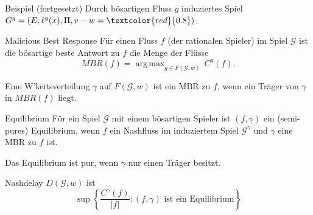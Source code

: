 \documentclass{beamer}
\DeclareMathOperator*{\argmax}{arg\,max}
\begin{document}
\begin{frame}{Beispiel (fortgesetzt)}
	Durch bösartigen Fluss $g$ induziertes Spiel $G^g = (E, \ell^g(x), \Pi, v-w = \textcolor{red}{0.8})$:
	\begin{figure}
	\end{figure}
\end{frame}

\begin{frame}{Malicious Best Response}
	Für einen Fluss $f$ (der rationalen Spieler) im Spiel $\mathcal G$ ist die \alert{bösartige beste Antwort} zu $f$ die Menge der Flüsse
	\[ MBR(f) = \argmax_{g \in F(\mathcal G, w)} \, C^g(f) .\]
	
	Eine W'keitsverteilung $\gamma$ auf $F(\mathcal G, w)$ ist ein MBR zu $f$, wenn ein Träger von $\gamma$ in $MBR(f)$ liegt.
\end{frame}

\begin{frame}{Equilibrium}
	Für ein Spiel $\mathcal G$ mit einem bösartigen Spieler ist $(f, \gamma)$ ein (semi-pures) \alert{Equilibrium}, wenn $f$ ein Nashfluss im induziertem Spiel $\mathcal G^\gamma$ und $\gamma$ eine MBR zu $f$ ist. 
	
	Das Equilibrium ist \alert{pur}, wenn $\gamma$ nur einen Träger besitzt.
	
	Nashdelay $D(\mathcal G, w)$ ist
	\[
		\sup \left\{\frac{C^\gamma(f)}{|f|} : (f,\gamma) \text{ ist ein Equilibrium} \right\}
	\]
\end{frame}
\end{document}
